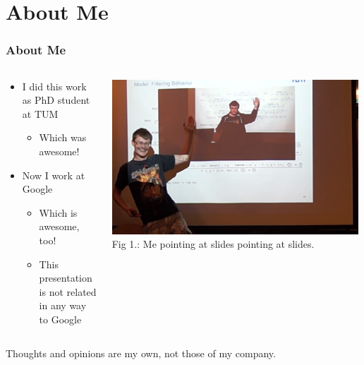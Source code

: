 \documentclass[aspectratio=169,t]{beamer}
\begin{document}
\section{About Me}
\begin{frame}
	\frametitle{About Me}
	\vspace*{5ex}
	\begin{columns}
	\begin{column}{0.5\textwidth}
		\begin{itemize}
			\item I did this work as PhD student at TUM
			\begin{itemize}
				\item Which was awesome!
			\end{itemize}
			\item Now I work at Google
			\begin{itemize}
				\item Which is awesome, too!
				\item This presentation is not related in any way to Google
			\end{itemize}
		\end{itemize}
	\end{column}
	\begin{column}{0.5\textwidth}
	    \begin{center}
	     \includegraphics[width=0.99\textwidth]{meta2.png}\\
	     {\scriptsize Fig 1.: Me pointing at slides pointing at slides.}
	     \end{center}
	\end{column}
	\end{columns}
	\bigskip
	\begin{center}
		Thoughts and opinions are my own, not those of my company.
	\end{center}
\end{frame}
\end{document}

